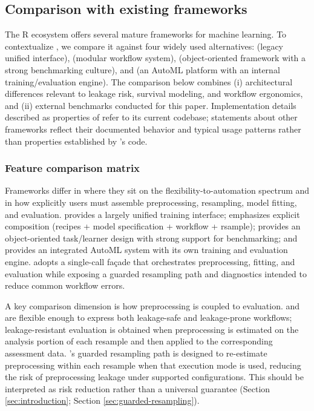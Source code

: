 \subsection{Comparison with existing frameworks}\label{comparison-with-existing-frameworks}

The R ecosystem offers several mature frameworks for machine learning. To contextualize , we compare it against four widely used alternatives:  \citep{caret_kuhn:2008aa} (legacy unified interface),  \citep{tidymodels_Kuhn:2020aa} (modular workflow system),  \citep{mlr3_Lang:2019aa} (object-oriented framework with a strong benchmarking culture), and  \citep{Fryda:2024_h2o_Rpkg} (an AutoML platform with an internal training/evaluation engine). The comparison below combines (i) architectural differences relevant to leakage risk, survival modeling, and workflow ergonomics, and (ii) external benchmarks conducted for this paper. Implementation details described as properties of  refer to its current codebase; statements about other frameworks reflect their documented behavior and typical usage patterns rather than properties established by 's code.

\subsubsection{Feature comparison matrix}\label{feature-comparison-matrix}

Frameworks differ in where they sit on the flexibility-to-automation spectrum and in how explicitly users must assemble preprocessing, resampling, model fitting, and evaluation.  provides a largely unified training interface;  emphasizes explicit composition (recipes + model specification + workflow + rsample);  provides an object-oriented task/learner design with strong support for benchmarking; and  provides an integrated AutoML system with its own training and evaluation engine.  adopts a single-call façade that orchestrates preprocessing, fitting, and evaluation while exposing a guarded resampling path and diagnostics intended to reduce common workflow errors.

A key comparison dimension is how preprocessing is coupled to evaluation.  and  are flexible enough to express both leakage-safe and leakage-prone workflows; leakage-resistant evaluation is obtained when preprocessing is estimated on the analysis portion of each resample and then applied to the corresponding assessment data. 's guarded resampling path is designed to re-estimate preprocessing within each resample when that execution mode is used, reducing the risk of preprocessing leakage under supported configurations. This should be interpreted as risk reduction rather than a universal guarantee (Section \ref{sec:introduction}; Section \ref{sec:guarded-resampling}).

